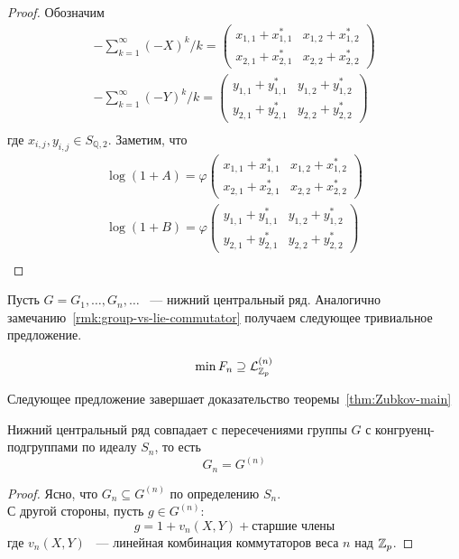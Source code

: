 \begin{proof}
    Обозначим
    \begin{gather*}
        -\sum\limits_{k=1}^{\infty} (-X)^k / k =
        \begin{pmatrix}
            x_{1,1} + x_{1,1}^* & x_{1,2} + x_{1,2}^* \\
            x_{2,1} + x_{2,1}^* & x_{2,2} + x_{2,2}^*
        \end{pmatrix}\\
        -\sum\limits_{k=1}^{\infty} (-Y)^k / k =
        \begin{pmatrix}
            y_{1,1} + y_{1,1}^* & y_{1,2} + y_{1,2}^* \\
            y_{2,1} + y_{2,1}^* & y_{2,2} + y_{2,2}^*
        \end{pmatrix}\\
    \end{gather*}
    где $x_{i,j}, y_{i,j} \in S_{\mathbb{Q}, 2}$.
    Заметим, что
    \begin{gather*}
        \log(1 + A) = \varphi
        \begin{pmatrix}
            x_{1,1} + x_{1,1}^* & x_{1,2} + x_{1,2}^* \\
            x_{2,1} + x_{2,1}^* & x_{2,2} + x_{2,2}^*
        \end{pmatrix}\\
        \log(1 + B) = \varphi
        \begin{pmatrix}
            y_{1,1} + y_{1,1}^* & y_{1,2} + y_{1,2}^* \\
            y_{2,1} + y_{2,1}^* & y_{2,2} + y_{2,2}^*
        \end{pmatrix}\\
    \end{gather*}



\end{proof}

Пусть $G=G_1,\ldots,G_n,\ldots$ ~--- нижний центральный ряд.
Аналогично замечанию~\ref{rmk:group-vs-lie-commutator} получаем следующее тривиальное предложение.
\begin{proposition}
    \label{prp:G_n-contains-L_n}
    \[
        \min F_n \supseteq \mathcal{L}^{(n)}_{\mathbb{Z}_p}
    \]
\end{proposition}

Следующее предложение завершает доказательство теоремы~\ref{thm:Zubkov-main}
\begin{proposition}
    Нижний центральный ряд совпадает с пересечениями группы $G$ с конгруенц-подгруппами по идеалу $S_n$, то есть
    \[
        G_n = G^{(n)}
    \]
\end{proposition}
\begin{proof}
    Ясно, что $G_n \subseteq G^{(n)}$ по определению $S_n$.\\
    С другой стороны, пусть $g\in G^{(n)}$:
    \[
        g = 1 + v_n(X, Y) + \text{старшие члены}
    \]
    где $v_n(X,Y)$ ~--- линейная комбинация коммутаторов веса $n$ над $\mathbb{Z}_p$.

\end{proof}
